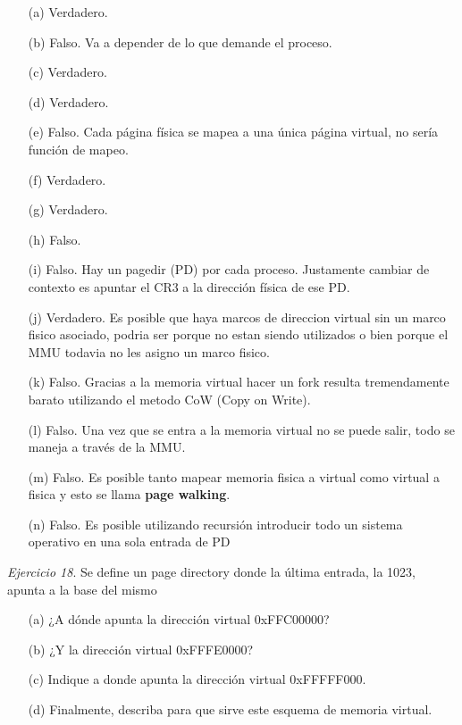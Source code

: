 \documentclass[12pt]{article}
\begin{document}
\begin{rta}
    \begin{itemize}
        \item[(a)] Verdadero.
        \item[(b)] Falso. Va a depender de lo que demande el proceso.
        \item[(c)] Verdadero.
        \item[(d)] Verdadero.
        \item[(e)] Falso. Cada página física se mapea a una única página virtual, no sería función de mapeo.
        \item[(f)] Verdadero.
        \item[(g)] Verdadero.
        \item[(h)] Falso.
        \item[(i)] Falso. Hay un pagedir (PD) por cada proceso. Justamente cambiar de contexto es apuntar el CR3 a la dirección física de ese PD.       
        \item[(j)] Verdadero. Es posible que haya marcos de direccion virtual sin un marco fisico asociado, podria ser porque no estan siendo utilizados o bien porque el MMU todavia no les asigno un marco fisico.
        \item[(k)] Falso. Gracias a la memoria virtual hacer un fork resulta tremendamente barato utilizando el metodo CoW (Copy on Write).  
        \item[(l)] Falso. Una vez que se entra a la memoria virtual no se puede salir, todo se maneja a través de la MMU.
        \item[(m)] Falso. Es posible tanto mapear memoria fisica a virtual como virtual a fisica y esto se llama \textbf{page walking}.
        \item[(n)] Falso. Es posible utilizando recursión introducir todo un sistema operativo en una sola entrada de PD    
    \end{itemize}
\end{rta}


\newpage
\noindent \textit{Ejercicio 18}. Se define un page directory donde la última entrada, la 1023, apunta a la base del
mismo

\begin{itemize}
    \item[(a)] ¿A dónde apunta la dirección virtual 0xFFC00000?
    \item[(b)] ¿Y la dirección virtual 0xFFFE0000?
    \item[(c)] Indique a donde apunta la dirección virtual 0xFFFFF000.
    \item[(d)] Finalmente, describa para que sirve este esquema de memoria virtual.
\end{itemize}
\end{document}

